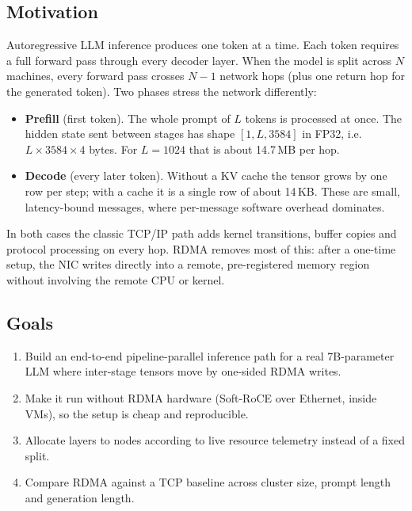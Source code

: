 \documentclass[11pt,a4paper]{article}
\begin{document}
\subsection{Motivation}
Autoregressive LLM inference produces one token at a time. Each token requires a full forward pass through every decoder layer. When the model is split across $N$ machines, every forward pass crosses $N-1$ network hops (plus one return hop for the generated token). Two phases stress the network differently:
\begin{itemize}[leftmargin=*]
  \item \textbf{Prefill} (first token). The whole prompt of $L$ tokens is processed at once. The hidden state sent between stages has shape $[1, L, 3584]$ in FP32, i.e.\ $L \times 3584 \times 4$ bytes. For $L=1024$ that is about 14.7\,MB per hop.
  \item \textbf{Decode} (every later token). Without a KV cache the tensor grows by one row per step; with a cache it is a single row of about 14\,KB. These are small, latency-bound messages, where per-message software overhead dominates.
\end{itemize}
In both cases the classic TCP/IP path adds kernel transitions, buffer copies and protocol processing on every hop. RDMA removes most of this: after a one-time setup, the NIC writes directly into a remote, pre-registered memory region without involving the remote CPU or kernel.

\subsection{Goals}
\begin{enumerate}[leftmargin=*]
  \item Build an end-to-end pipeline-parallel inference path for a real 7B-parameter LLM where inter-stage tensors move by one-sided RDMA writes.
  \item Make it run without RDMA hardware (Soft-RoCE over Ethernet, inside VMs), so the setup is cheap and reproducible.
  \item Allocate layers to nodes according to live resource telemetry instead of a fixed split.
  \item Compare RDMA against a TCP baseline across cluster size, prompt length and generation length.
\end{enumerate}
\end{document}

